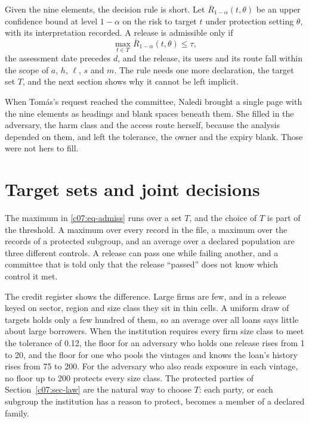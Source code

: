 Given the nine elements, the decision rule is short. Let
$\overline{R}_{1-\alpha}(t,\theta)$ be an upper confidence bound at level
$1-\alpha$ on the risk to target $t$ under protection setting $\theta$, with its
interpretation recorded. A release is admissible only if
\begin{equation}\label{c07:eq-admiss}
\max_{t \in T} \overline{R}_{1-\alpha}(t,\theta) \le \tau ,
\end{equation}
the assessment date precedes $d$, and the release, its users and its route fall
within the scope of $a$, $h$, $\ell$, $s$ and $m$. The rule needs one more
declaration, the target set $T$, and the next section shows why it cannot be left
implicit.

When Tom\'as's request reached the committee, Naledi brought a single page with the
nine elements as headings and blank spaces beneath them. She filled in the
adversary, the harm class and the access route herself, because the analysis
depended on them, and left the tolerance, the owner and the expiry blank. Those
were not hers to fill.

\section{Target sets and joint decisions}\label{c07:sec-targets}

The maximum in \eqref{c07:eq-admiss} runs over a set $T$, and the choice of $T$ is
part of the threshold. A maximum over every record in the file, a maximum over the
records of a protected subgroup, and an average over a declared population are
three different controls. A release can pass one while failing another, and a
committee that is told only that the release ``passed'' does not know which control
it met.

The credit register shows the difference. Large firms are few, and in a release
keyed on sector, region and size class they sit in thin cells. A uniform draw of
targets holds only a few hundred of them, so an average over all loans says little
about large borrowers. When the institution requires every firm size class to meet
the tolerance of 0.12, the floor for an adversary who holds one release rises from 1
to 20, and the floor for one who pools the vintages and knows the loan's history
rises from 75 to 200.
For the adversary who also reads exposure in each vintage, no floor up to 200
protects every size class. The protected parties of Section~\ref{c07:sec-law} are
the natural way to choose $T$: each party, or each subgroup the institution has a
reason to protect, becomes a member of a declared family.

